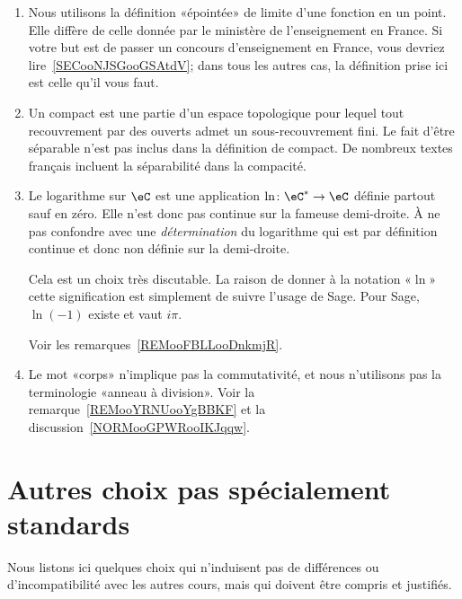 \begin{enumerate}
    \item
        Nous utilisons la définition «épointée» de limite d'une fonction en un point. Elle diffère de celle donnée par le ministère de l'enseignement en France. Si votre but est de passer un concours d'enseignement en France, vous devriez lire~\ref{SECooNJSGooGSAtdV}; dans tous les autres cas, la définition prise ici est celle qu'il vous faut.
    \item
        Un compact est une partie d'un espace topologique pour lequel tout recouvrement par des ouverts admet un sous-recouvrement fini. Le fait d'être séparable n'est pas inclus dans la définition de compact. De nombreux textes français incluent la séparabilité dans la compacité.
    \item
        Le logarithme sur \( \eC\) est une application \( \ln\colon \eC^*\to \eC\) définie partout sauf en zéro. Elle n'est donc pas continue sur la fameuse demi-droite. À ne pas confondre avec une \emph{détermination} du logarithme qui est par définition continue et donc non définie sur la demi-droite.

        Cela est un choix très discutable. La raison de donner à la notation «\( \ln\)» cette signification est simplement de suivre l'usage de Sage. Pour Sage, \( \ln(-1)\) existe et vaut \( i\pi\).

        Voir les remarques~\ref{REMooFBLLooDnkmjR}.
    \item
        Le mot «corps» n'implique pas la commutativité, et nous n'utilisons pas la terminologie «anneau à division». Voir la remarque~\ref{REMooYRNUooYgBBKF} et la discussion~\ref{NORMooGPWRooIKJqqw}.
\end{enumerate}

\section{Autres choix pas spécialement standards}

Nous listons ici quelques choix qui n'induisent pas de différences ou d'incompatibilité avec les autres cours, mais qui doivent être compris et justifiés.

